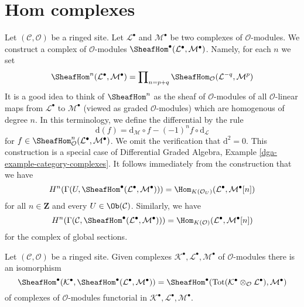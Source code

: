 \section{Hom complexes}
\label{section-hom-complexes}

\noindent
Let $(\mathcal{C}, \mathcal{O})$ be a ringed site. Let
$\mathcal{L}^\bullet$ and $\mathcal{M}^\bullet$ be two complexes
of $\mathcal{O}$-modules. We construct a complex
of $\mathcal{O}$-modules
$\SheafHom^\bullet(\mathcal{L}^\bullet, \mathcal{M}^\bullet)$.
Namely, for each $n$ we set
$$
\SheafHom^n(\mathcal{L}^\bullet, \mathcal{M}^\bullet) =
\prod\nolimits_{n = p + q}
\SheafHom_\mathcal{O}(\mathcal{L}^{-q}, \mathcal{M}^p)
$$
It is a good idea to think of $\SheafHom^n$ as the
sheaf of $\mathcal{O}$-modules of all $\mathcal{O}$-linear
maps from $\mathcal{L}^\bullet$ to $\mathcal{M}^\bullet$
(viewed as graded $\mathcal{O}$-modules) which are homogenous
of degree $n$. In this terminology, we define the differential by the rule
$$
\text{d}(f) =
\text{d}_\mathcal{M} \circ f - (-1)^n f \circ \text{d}_\mathcal{L}
$$
for
$f \in \SheafHom^n_\mathcal{O}(\mathcal{L}^\bullet, \mathcal{M}^\bullet)$.
We omit the verification that $\text{d}^2 = 0$.
This construction is a special case of
Differential Graded Algebra, Example \ref{dga-example-category-complexes}.
It follows immediately from the construction that we have
\begin{equation}
\label{equation-cohomology-hom-complex}
H^n(\Gamma(U, \SheafHom^\bullet(\mathcal{L}^\bullet, \mathcal{M}^\bullet))) =
\Hom_{K(\mathcal{O}_U)}(\mathcal{L}^\bullet, \mathcal{M}^\bullet[n])
\end{equation}
for all $n \in \mathbf{Z}$ and every $U \in \Ob(\mathcal{C})$. Similarly,
we have
\begin{equation}
\label{equation-global-cohomology-hom-complex}
H^n(\Gamma(\mathcal{C},
\SheafHom^\bullet(\mathcal{L}^\bullet, \mathcal{M}^\bullet))) =
\Hom_{K(\mathcal{O})}(\mathcal{L}^\bullet, \mathcal{M}^\bullet[n])
\end{equation}
for the complex of global sections.

\begin{lemma}
\label{lemma-compose}
Let $(\mathcal{C}, \mathcal{O})$ be a ringed site.
Given complexes $\mathcal{K}^\bullet, \mathcal{L}^\bullet, \mathcal{M}^\bullet$
of $\mathcal{O}$-modules there is an isomorphism
$$
\SheafHom^\bullet(\mathcal{K}^\bullet,
\SheafHom^\bullet(\mathcal{L}^\bullet, \mathcal{M}^\bullet))
=
\SheafHom^\bullet(\text{Tot}(\mathcal{K}^\bullet \otimes_\mathcal{O}
\mathcal{L}^\bullet), \mathcal{M}^\bullet)
$$
of complexes of $\mathcal{O}$-modules functorial in
$\mathcal{K}^\bullet, \mathcal{L}^\bullet, \mathcal{M}^\bullet$.
\end{lemma}


